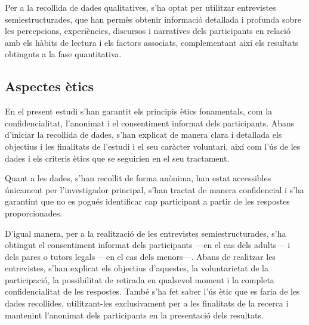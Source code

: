\documentclass[12pt]{article}
\begin{document}
Per a la recollida de dades qualitatives, s'ha optat per utilitzar entrevistes semiestructurades, que han permès obtenir informació detallada i profunda sobre les percepcions, experiències, discursos i narratives dels participants en relació amb els hàbits de lectura i els factors associats, complementant així els resultats obtinguts a la fase quantitativa.




\subsection{Aspectes ètics}

En el present estudi s'han garantit els principis ètics fonamentals, com la confidencialitat, l’anonimat i el consentiment informat dels participants. Abans d’iniciar la recollida de dades, s’han explicat de manera clara i detallada els objectius i les finalitats de l’estudi i el seu caràcter voluntari, així com l’ús de les dades i els criteris ètics que se seguirien en el seu tractament.

Quant a les dades, s'han recollit de forma anònima, han estat accessibles únicament per l’investigador principal, s'han tractat de manera confidencial i s'ha garantint que no es pogués identificar cap participant a partir de les respostes proporcionades.

D'igual manera, per a la realització de les entrevistes semiestructurades, s'ha obtingut el consentiment informat dels participants ---en el cas dels adults--- i dels pares o tutors legals ---en el cas dels menors---. Abans de realitzar les entrevistes, s'han explicat els objectius d'aquestes, la voluntarietat de la participació, la possibilitat de retirada en qualsevol moment i la completa confidencialitat de les respostes. També s'ha fet saber l'ús ètic que es faria de les dades recollides, utilitzant-les exclusivament per a les finalitats de la recerca i mantenint l'anonimat dels participants en la presentació dels resultats.
\end{document}
